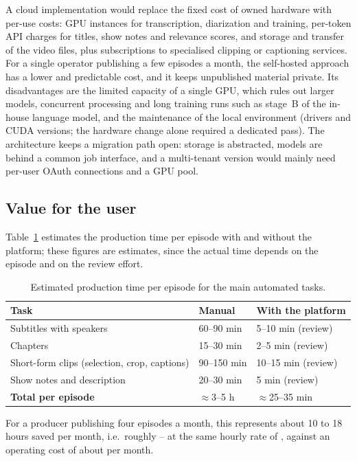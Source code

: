 A cloud implementation would replace the fixed cost of owned hardware with per-use costs: GPU instances for transcription, diarization and training, per-token API charges for titles, show notes and relevance scores, and storage and transfer of the video files, plus subscriptions to specialised clipping or captioning services. For a single operator publishing a few episodes a month, the self-hosted approach has a lower and predictable cost, and it keeps unpublished material private. Its disadvantages are the limited capacity of a single GPU, which rules out larger models, concurrent processing and long training runs such as stage~B of the in-house language model, and the maintenance of the local environment (drivers and CUDA versions; the hardware change alone required a dedicated pass). The architecture keeps a migration path open: storage is abstracted, models are behind a common job interface, and a multi-tenant version would mainly need per-user OAuth connections and a GPU pool.

\subsection*{Value for the user}

Table~\ref{tab:creator_value} estimates the production time per episode with and without the platform; these figures are estimates, since the actual time depends on the episode and on the review effort.

\begin{table}[H]
\centering
\caption{Estimated production time per episode for the main automated tasks.}
\label{tab:creator_value}
\small
\begin{tabular}{@{}lll@{}}
\toprule
\textbf{Task} & \textbf{Manual} & \textbf{With the platform} \\
\midrule
Subtitles with speakers & 60--90 min & 5--10 min (review) \\
Chapters & 15--30 min & 2--5 min (review) \\
Short-form clips (selection, crop, captions) & 90--150 min & 10--15 min (review) \\
Show notes and description & 20--30 min & 5 min (review) \\
\midrule
\textbf{Total per episode} & $\approx$3--5 h & $\approx$25--35 min \\
\bottomrule
\end{tabular}
\end{table}

For a producer publishing four episodes a month, this represents about 10 to 18 hours saved per month, i.e.\ roughly -- at the same hourly rate of , against an operating cost of about  per month.

